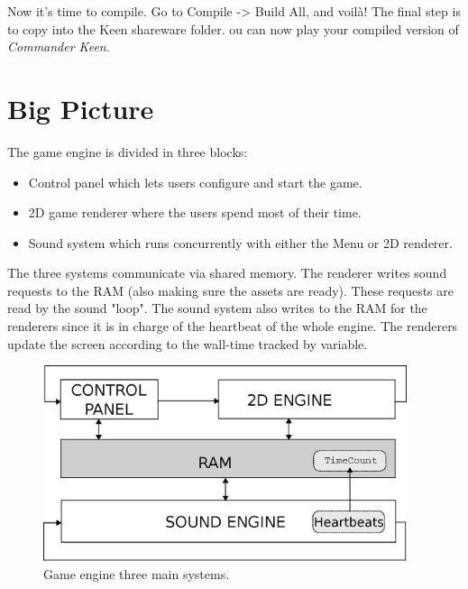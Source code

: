 \documentclass[book.tex]{subfiles}
\begin{document}
\par
Now it's time to compile. Go to Compile -> Build All, and voil\`a! The final step is to copy  into the Keen shareware folder. ou can now play your compiled version of \textit{Commander Keen}. \\

\begin{figure}[H]
\centering
\end{figure}

 \begin{figure}[H]
\centering
\end{figure}


\section{Big Picture}
The game engine is divided in three blocks:
\begin{itemize}
\item Control panel which lets users configure and start the game.
\item 2D game renderer where the users spend most of their time.
\item Sound system which runs concurrently with either the Menu or 2D renderer. 
\end{itemize}
The three systems communicate via shared memory. The renderer writes sound requests to the RAM (also making sure the assets are ready). These requests are read by the sound "loop". The sound system also writes to the RAM for the renderers since it is in charge of the heartbeat of the whole engine. The renderers update the screen according to the wall-time tracked by  variable.
\par
\begin{figure}[H]
\centering
 \includegraphics[width=0.95\textwidth]{imgs/drawings/three_systems.eps}
 \caption{Game engine three main systems.}
 \end{figure}
 \par
 
\end{document}
